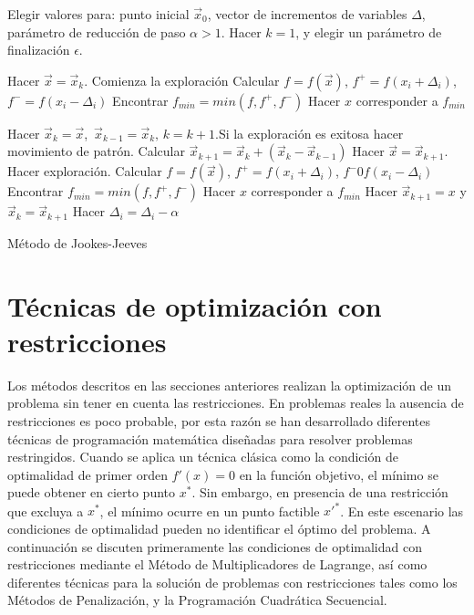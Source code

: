 \begin{algorithm}
	\begin{algorithmic}[1]
		\STATE Elegir valores para: punto inicial $\vec{x}_0$, vector de incrementos de variables $\Delta$, parámetro de reducción de paso   $\alpha>1$. Hacer $k=1$, y elegir un parámetro de finalización $\epsilon$. 
        
		\WHILE {$  \epsilon <|| \Delta||$}
		\STATE Hacer $\vec{x}=\vec{x}_k$. Comienza la exploración
         \STATE Calcular $f=f(\vec{x})$, $f^+=f(x_i+ \Delta_i)$, $f^- =f(x_i- \Delta_i)$
         \STATE Encontrar $f_{min}= min(f,f^+,f^-)$
         \STATE Hacer $x$ corresponder a $f_{min}$
          \ENDFOR
          
          \STATE Hacer $\vec{x}_k=\vec{x}$,\, $\vec{x}_{k-1}=\vec{x}_k,\, k=k+1 $.Si la exploración es exitosa hacer movimiento de patrón.
          \STATE Calcular $\vec{x}_{k+1}=\vec{x}_{k}+(\vec{x}_{k}-\vec{x}_{k-1})$
           \STATE Hacer $\vec{x}=\vec{x}_{k+1}$. Hacer exploración.
            	 \STATE Calcular $f=f(\vec{x})$, $f^+=f(x_i+ \Delta_i)$, $f^-0f(x_i- \Delta_i)$
            	 \STATE Encontrar $f_{min}= min(f,f^+,f^-)$
            	 \STATE Hacer $x$ corresponder a $f_{min}$
             \ENDFOR
           \STATE Hacer $\vec{x}_{k+1}=x$ y $\vec{x}_{k}=\vec{x}_{k+1}$
          \ENDWHILE
          \ENDIF
            	 \STATE Hacer $ \Delta_i=\Delta_i-\alpha$
             \ENDFOR
		\ENDWHILE
	\end{algorithmic}
	\caption{Método de Jookes-Jeeves}\label{alg:Jookes-Jeeves}
\end{algorithm}
\section{Técnicas de optimización con restricciones}
Los métodos descritos en las secciones anteriores realizan la optimización de un problema sin tener en cuenta las restricciones. En problemas reales la ausencia de restricciones es poco probable, por esta razón se han desarrollado diferentes técnicas de programación matemática diseñadas para resolver problemas restringidos. Cuando se aplica un técnica clásica como la condición de optimalidad de primer orden $f'(x)=0$ en la función objetivo, el mínimo se puede obtener en cierto punto $x^*$. Sin embargo, en presencia de una restricción que excluya a $x^*$, el mínimo ocurre en un punto factible ${x'}^*$. En este escenario las condiciones de optimalidad pueden no identificar el óptimo del problema. A continuación se discuten primeramente las condiciones de optimalidad con restricciones mediante el Método de Multiplicadores de Lagrange, así como diferentes técnicas para la solución de problemas con restricciones tales como los Métodos de Penalización, y la Programación Cuadrática Secuencial.

